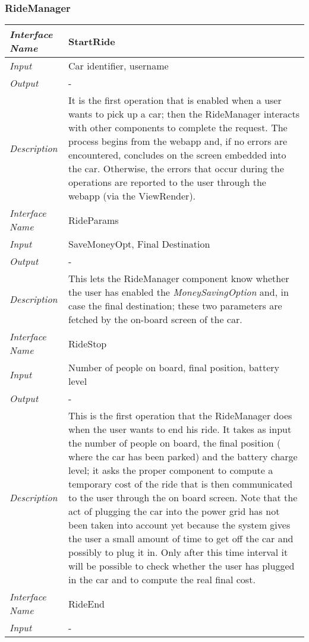 \documentclass[11pt,a4paper]{report}
\begin{document}
\subsubsection{RideManager}
\begin{tabularx}{\textwidth}{|>{\em}l|X|}
	\hline
	Interface Name& StartRide\\
	\hline
	Input & Car identifier, username\\
	\hline
	Output & -\\
	\hline
	Description &It is the first operation that is enabled when a user wants to pick up a car; then the RideManager interacts with other components to complete the request. The process begins from the webapp and, if no errors are encountered, concludes on the screen embedded into the car. Otherwise, the errors that occur during the operations are reported to the user through the webapp (via the ViewRender).\\
	\hline
	\hline
	Interface Name& RideParams\\
	\hline
	Input &SaveMoneyOpt, Final Destination\\
	\hline
	Output & -\\
	\hline
	Description &This lets the RideManager component know whether the user has enabled the \textit{MoneySavingOption} and, in case the final destination; these two parameters are fetched by the on-board screen of the car.\\
	\hline
	\hline
	Interface Name& RideStop\\
	\hline
	Input &Number of people on board, final position, battery level\\
	\hline
	Output & -\\
	\hline
	Description &This is the first operation that the RideManager does when the user wants to end his ride. It takes as input the number of people on board, the final position ( where the car has been parked) and the battery charge level; it asks the proper component to compute a temporary cost of the ride that is then communicated to the user through the on board screen. Note that the act of plugging the car into the power grid has not been taken into account yet because the system gives the user a small amount of time to get off the car and possibly to plug it in. Only after this time interval it will be possible to check whether the user has plugged in the car and to compute the real final cost.\\
	\hline
	\hline
	Interface Name& RideEnd\\
	\hline
	Input &-\\

\end{tabularx}
\end{document}
